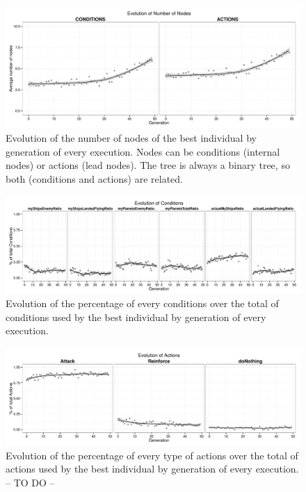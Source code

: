 \documentclass[preprint]{elsarticle}
\begin{document}
 \begin{figure}[ht]
 \begin{center}
   \includegraphics[width=12cm]{nuevas_imgs/estudio_number_nodes.pdf}
 \end{center}
 \caption{Evolution of the number of nodes of the best individual by generation of every execution. Nodes can be conditions (internal nodes) or actions (lead nodes). The tree is always a binary tree, so both (conditions and actions) are related.}
 \label{figura:e_number_nodes}
 \end{figure}

 \begin{figure}[ht]
 \begin{center}
   \includegraphics[width=12cm]{nuevas_imgs/estudio_CONDITIONS.pdf}
 \end{center}
 \caption{Evolution of the percentage of every conditions over the total of conditions used by the best individual by generation of every execution.}
 \label{figura:e_conditions}
 \end{figure}

 \begin{figure}[ht]
 \begin{center}
   \includegraphics[width=12cm]{nuevas_imgs/estudio_ACTIONS.pdf}
 \end{center}
 \caption{Evolution of the percentage of every type of actions over the total of actions used by the best individual by generation of every execution. -- TO DO -- %
 }
 \label{figura:e_actions}
 \end{figure}
\end{document}
